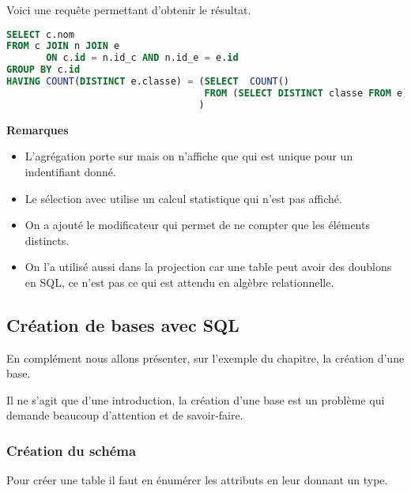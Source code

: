 Voici une requête permettant d'obtenir le résultat.
\begin{lstlisting}[language=SQL]
SELECT c.nom
FROM c JOIN n JOIN e 
       ON c.id = n.id_c AND n.id_e = e.id
GROUP BY c.id
HAVING COUNT(DISTINCT e.classe) = (SELECT  COUNT()
                                   FROM (SELECT DISTINCT classe FROM e)
                                  )
\end{lstlisting}
{\bf Remarques}
\begin{itemize}
    \item L'agrégation porte sur  mais on n'affiche que  qui est unique pour un indentifiant donné.
    \item Le sélection avec  utilise un calcul statistique qui n'est pas affiché.
    \item On a ajouté le modificateur  qui permet de ne compter que les éléments distincts.
    \item On l'a utilisé aussi dans la projection  car une table peut avoir des doublons en SQL, ce n'est pas ce qui est attendu en algèbre relationnelle.
\end{itemize}
\newpage
\subsection{Création de bases avec SQL} 
En complément nous allons présenter, sur l'exemple du chapitre, la création d'une base.

Il ne s'agit que d'une introduction, la création d'une base est un problème qui demande beaucoup d'attention et de savoir-faire.
\subsubsection{Création du schéma}
Pour créer une table il faut en énumérer les attributs en leur donnant un type. 

